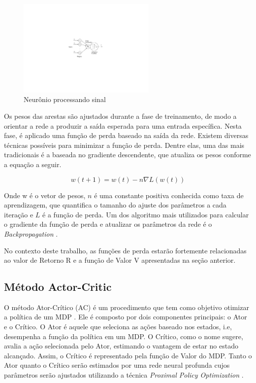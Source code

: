 \begin{figure}[H]
     \centering
     \includegraphics[width=0.6\textwidth]{figuras/ActivationFunc.pdf}
     \caption{Neurônio processando sinal \cite{Figueiredo}}
\end{figure}

Os pesos das arestas são ajustados durante a fase de treinamento,  de modo a orientar a rede a produzir a saída esperada para uma entrada específica. 
Nesta fase, é aplicado uma função de perda baseado na saída da rede. 
Existem diversas técnicas possíveis para minimizar a função de perda. 
Dentre elas, uma das mais tradicionais é a baseada no gradiente descendente, que atualiza os pesos conforme a equação a seguir. 

\begin{equation}
    w(t +1) = w(t) - n\nabla L(w(t)) 
\end{equation}

Onde w é o vetor de pesos, $n$ é uma constante positiva conhecida como taxa de aprendizagem, 
que quantifica o tamanho do ajuste dos parâmetros a cada iteração e $L$ é a função de perda. 
Um dos algoritmo mais utilizados para calcular o gradiente da função de perda e atualizar os parâmetros da rede é o \textit{Backpropagation} \cite{Bishop}. 

No contexto deste trabalho, as funções de perda estarão fortemente relacionadas ao valor de Retorno R e a função de Valor V apresentadas na seção anterior. 


\subsection{Método Actor-Critic}

O método Ator-Crítico (AC) é um procedimento que tem como objetivo otimizar a política de um MDP \cite{AC}. 
Ele é composto por dois componentes principais: o Ator e o Crítico. 
O Ator é aquele que seleciona as ações baseado nos estados, i.e, desempenha a função da política em um MDP. 
O Crítico, como o nome sugere, avalia a ação selecionada pelo Ator, estimando o vantagem de estar no estado alcançado. 
Assim, o Crítico é representado pela função de Valor do MDP. 
Tanto o Ator quanto o Crítico serão estimados por uma rede neural profunda cujos parâmetros serão ajustados utilizando a técnica \textit{Proximal Policy Optimization} \cite{PPO}.


